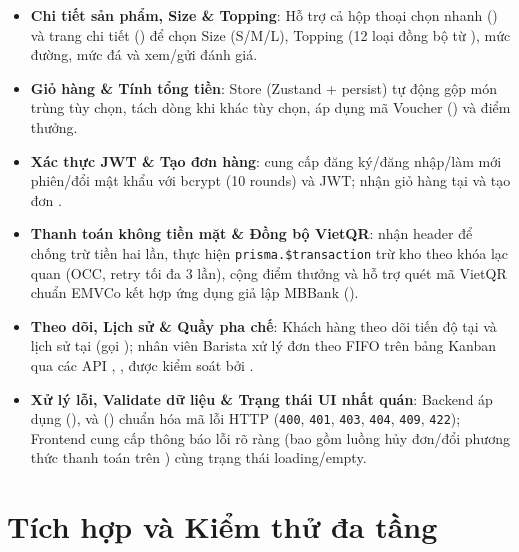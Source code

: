 \documentclass[12pt,a4paper]{report}
\begin{document}
\begin{itemize}[leftmargin=*]
\item \textbf{Chi tiết sản phẩm, Size \& Topping}: Hỗ trợ cả hộp thoại chọn nhanh () và trang chi tiết () để chọn Size (S/M/L), Topping (12 loại đồng bộ từ ), mức đường, mức đá và xem/gửi đánh giá.
\item \textbf{Giỏ hàng \& Tính tổng tiền}: Store  (Zustand + persist) tự động gộp món trùng tùy chọn, tách dòng khi khác tùy chọn, áp dụng mã Voucher () và điểm thưởng.
\item \textbf{Xác thực JWT \& Tạo đơn hàng}:  cung cấp đăng ký/đăng nhập/làm mới phiên/đổi mật khẩu với bcrypt (10 rounds) và JWT;  nhận giỏ hàng tại  và tạo đơn .
\item \textbf{Thanh toán không tiền mặt \& Đồng bộ VietQR}:  nhận header  để chống trừ tiền hai lần, thực hiện \texttt{prisma.\$transaction} trừ kho theo khóa lạc quan (OCC, retry tối đa 3 lần), cộng điểm thưởng và hỗ trợ quét mã VietQR chuẩn EMVCo kết hợp ứng dụng giả lập MBBank ().
\item \textbf{Theo dõi, Lịch sử \& Quầy pha chế}: Khách hàng theo dõi tiến độ tại  và lịch sử tại  (gọi ); nhân viên Barista xử lý đơn theo FIFO trên bảng Kanban  qua các API , ,  được kiểm soát bởi .
\item \textbf{Xử lý lỗi, Validate dữ liệu \& Trạng thái UI nhất quán}: Backend áp dụng  (),  và  () chuẩn hóa mã lỗi HTTP (\texttt{400}, \texttt{401}, \texttt{403}, \texttt{404}, \texttt{409}, \texttt{422}); Frontend cung cấp thông báo lỗi rõ ràng (bao gồm luồng hủy đơn/đổi phương thức thanh toán trên ) cùng trạng thái loading/empty.
\end{itemize}

\section{Tích hợp và Kiểm thử đa tầng}
\end{document}
